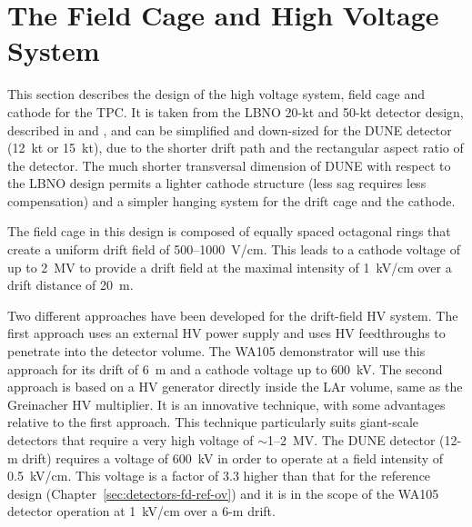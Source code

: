 \section{The Field Cage and High Voltage System} 
\label{sec:detectors-fd-alt-hv}

This section describes the design of the high voltage system, field
cage and cathode for the TPC.  It is taken from the 
LBNO 20-kt and 50-kt detector design, described in \anxlbnoa and \anxlbnob,
and can be simplified and down-sized for the DUNE detector 
(12~kt or 15~kt), %
due to the shorter drift path and the rectangular aspect ratio of the
detector. The much shorter transversal dimension of DUNE with respect to the LBNO design
permits a lighter cathode structure (less sag requires less compensation) 
and a simpler hanging system for the drift cage and the cathode.

The field cage in this design is
composed of equally spaced octagonal rings that create a uniform
drift field of 500--1000~V/cm. This leads to a cathode voltage of up to 2~MV 
to provide a drift field at
the maximal intensity of 1~kV/cm over a drift distance of 20~m. 

Two different approaches have been developed %
for the
drift-field HV system. The first approach uses an external HV power supply
and uses HV feedthroughs to penetrate into the detector volume.
The  WA105 demonstrator will use this
approach %
for its drift
of 6~m and a cathode voltage up to 600~kV.  The second approach is
based on a HV generator directly inside the LAr volume,  same
as the Greinacher HV multiplier. It is an innovative technique, 
with
some advantages relative to the first approach. This technique
particularly suits giant-scale detectors that require a very high voltage of
$\sim$1--2~MV. The DUNE detector (12-m drift) requires a voltage
of 600~kV  in order to operate at a field intensity of
0.5~kV/cm. This voltage is a factor of 3.3 higher than that for %
the reference design (Chapter~\ref{sec:detectors-fd-ref-ov}) and it is in the scope of the WA105 detector
operation at 1~kV/cm over a 6-m drift. 

